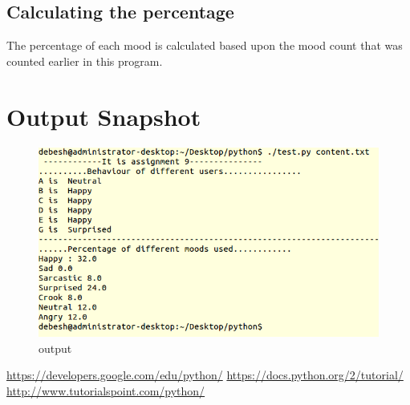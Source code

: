 \documentclass[a4paper,10pt]{report}
\begin{document}
\section{Calculating the percentage}
The percentage of each mood is calculated based upon the mood count that was counted earlier in this program.




\newpage
\chapter{Output Snapshot}
\begin{figure}[ht]
 \centering
 \includegraphics[scale=0.8]{./Selection_006.png}
 \caption{output}
\end{figure}












\newpage %
\begin{thebibliography}{widestlabel} %
\bibitem{}\url{https://developers.google.com/edu/python/}          %
\bibitem{}\url{https://docs.python.org/2/tutorial/}
\bibitem{}\url{http://www.tutorialspoint.com/python/}


\end{thebibliography} %
\end{document}
